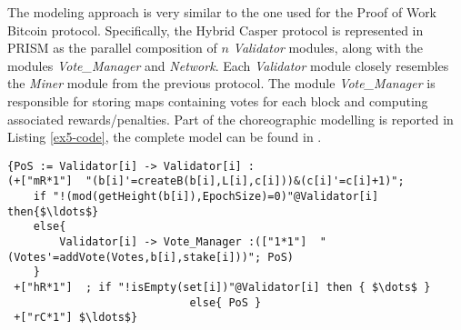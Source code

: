 The modeling approach is very similar to the one used for the Proof of Work Bitcoin protocol. Specifically, the Hybrid Casper protocol is represented in PRISM as the parallel composition of $n$ \emph{Validator} modules, along with the modules \emph{Vote\_Manager} and \emph{Network}. Each \emph{Validator} module closely resembles the \emph{Miner} module from the previous protocol. The module \emph{Vote\_Manager} is responsible for storing maps containing votes for each block and computing associated rewards/penalties.
Part of the choreographic modelling is reported in Listing \ref{ex5-code}, the complete model can be found in \cite{repository}. 
\begin{lstlisting}[style=chor-color,tabsize=2,breaklines=true, postbreak=\mbox{\textcolor{red}{$\hookrightarrow$}\space},	caption={Excerpt of the Hybrid Casper Protocol as a choreography},captionpos=b,label={ex5-code}]
{PoS := Validator[i] -> Validator[i] :
(+["mR*1"]  "(b[i]'=createB(b[i],L[i],c[i]))&(c[i]'=c[i]+1)"; 
	if "!(mod(getHeight(b[i]),EpochSize)=0)"@Validator[i] then{$\ldots$}
	else{
		Validator[i] -> Vote_Manager :(["1*1"]  "(Votes'=addVote(Votes,b[i],stake[i]))"; PoS)
	}
 +["hR*1"]  ; if "!isEmpty(set[i])"@Validator[i] then { $\dots$ }
 							else{ PoS }
 +["rC*1"] $\ldots$}

\end{lstlisting}
